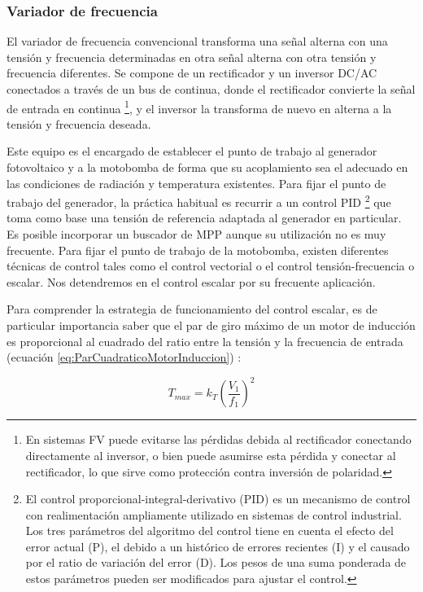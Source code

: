 \subsubsection{Variador de frecuencia}

El variador de frecuencia convencional transforma una señal alterna
con una tensión y frecuencia determinadas en otra señal alterna con
otra tensión y frecuencia diferentes. Se compone de un rectificador
y un inversor DC/AC conectados a través de un bus de continua, donde
el rectificador convierte la señal de entrada en continua%
\footnote{En sistemas FV puede evitarse las pérdidas debida al rectificador
conectando directamente al inversor, o bien puede asumirse esta pérdida
y conectar al rectificador, lo que sirve como protección contra inversión
de polaridad. %
}, y el inversor la transforma de nuevo en alterna a la tensión y frecuencia
deseada. 

Este equipo es el encargado de establecer el punto de trabajo al generador
fotovoltaico y a la motobomba de forma que su acoplamiento sea el
adecuado en las condiciones de radiación y temperatura existentes.
Para fijar el punto de trabajo del generador, la práctica habitual
es recurrir a un control PID%
\footnote{El control proporcional-integral-derivativo (PID) es un mecanismo
de control con realimentación ampliamente utilizado en sistemas de
control industrial. Los tres parámetros del algoritmo del control
tiene en cuenta el efecto del error actual (P), el debido a un histórico
de errores recientes (I) y el causado por el ratio de variación del
error (D). Los pesos de una suma ponderada de estos parámetros pueden
ser modificados para ajustar el control.%
} que toma como base una tensión de referencia adaptada al generador
en particular. Es posible incorporar un buscador de MPP aunque su
utilización no es muy frecuente. Para fijar el punto de trabajo de
la motobomba, existen diferentes técnicas de control tales como el
control vectorial o el control tensión-frecuencia o escalar. Nos detendremos
en el control escalar por su frecuente aplicación.

Para comprender la estrategia de funcionamiento del control escalar,
es de particular importancia saber que el par de giro máximo de un
motor de inducción es proporcional al cuadrado del ratio entre la
tensión y la frecuencia de entrada (ecuación \ref{eq:ParCuadraticoMotorInduccion})
\cite{FraileMora2003}:

\begin{equation}
T_{max}=k_{T}\left(\frac{V_{1}}{f_{1}}\right)^{2}\label{eq:ParCuadraticoMotorInduccion}\end{equation}


